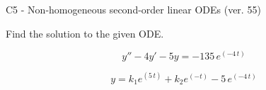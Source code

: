 \begin{exercise}
  \begin{exerciseTitle}C5 - Non-homogeneous second-order linear ODEs (ver. 55)\end{exerciseTitle}
  \begin{exerciseStatement}
    
Find the solution to the given ODE.

    
\[y''-4y'-5y = -135 \, e^{\left(-4 \, t\right)}\]

  \end{exerciseStatement}
  \begin{exerciseAnswer}
    
\[y= k_{1} e^{\left(5 \, t\right)} + k_{2} e^{\left(-t\right)} - 5 \, e^{\left(-4 \, t\right)}\]

  \end{exerciseAnswer}
\end{exercise}